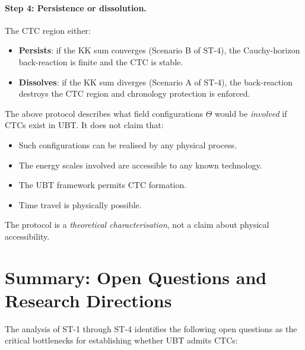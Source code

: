 \documentclass[12pt]{article}
\begin{document}
\paragraph{Step 4: Persistence or dissolution.}
The CTC region either:
\begin{itemize}
  \item \textbf{Persists}: if the KK sum converges (Scenario B of ST-4),
    the Cauchy-horizon back-reaction is finite and the CTC is stable.
  \item \textbf{Dissolves}: if the KK sum diverges (Scenario A of ST-4),
    the back-reaction destroys the CTC region and chronology protection
    is enforced.
\end{itemize}

\begin{tcolorbox}[colback=orange!10, title=Critical Framing Note]
The above protocol describes what field configurations $\Theta$ would be
\emph{involved} if CTCs exist in UBT.  It does not claim that:
\begin{itemize}
  \item Such configurations can be realised by any physical process.
  \item The energy scales involved are accessible to any known technology.
  \item The UBT framework permits CTC formation.
  \item Time travel is physically possible.
\end{itemize}
The protocol is a \emph{theoretical characterisation}, not a claim about
physical accessibility.
\end{tcolorbox}

\section{Summary: Open Questions and Research Directions}
The analysis of ST-1 through ST-4 identifies the following open questions
as the critical bottlenecks for establishing whether UBT admits CTCs:
\end{document}
